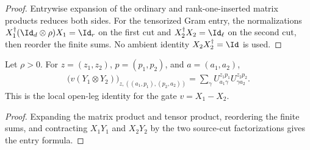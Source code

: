 \begin{proof}
    \leanok
    Entrywise expansion of the ordinary and rank-one-inserted matrix products reduces both sides.
    For the tensorized Gram entry, the normalizations
    $X_1^\dagger(\Id_d\otimes\rho)X_1=\Id_r$ on the first cut and
    $X_2^\dagger X_2=\Id_\ell$ on the second cut, then reorder the finite
    sums. No ambient identity $X_2X_2^\dagger=\Id$ is used.
\end{proof}

\begin{lemma}
    \label{thm:mpu_source_v_mul_source_y_tensor_entry}
    \leanok
    Let $\rho>0$. For $z=(z_1,z_2)$, $p=(p_1,p_2)$, and
    $a=(a_1,a_2)$,
    \begin{align}
        \bigl(v(Y_1\otimes Y_2)\bigr)_{z,((a_1,p_1),(p_2,a_2))}
        =\sum_\gamma U^{z_1p_1}_{a_1\gamma}U^{z_2p_2}_{\gamma a_2}.
    \end{align}
    This is the local open-leg identity for the gate
    $v=X_1\mathbin{-}X_2$.
\end{lemma}

\begin{proof}\leanok
    Expanding the matrix product and tensor product, reordering the finite sums, and
    contracting $X_1Y_1$ and $X_2Y_2$ by the two source-cut factorizations gives the entry formula.
\end{proof}


